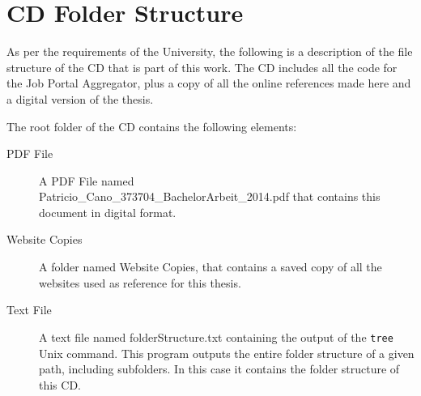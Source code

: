 \section{CD Folder Structure}
As per the requirements of the University, the following is a description of the file structure of the CD that is part of this work. The CD includes all the code for the Job Portal Aggregator, plus a copy of all the online references made here and a digital version of the thesis.

The root folder of the CD contains the following elements:
\begin{description}
\item[PDF File] A PDF File named\\ Patricio\_Cano\_373704\_BachelorArbeit\_2014.pdf that contains this document in digital format.
\item[Website Copies] A folder named Website Copies, that contains a saved copy of all the websites used as reference for this thesis.
\item[Text File] A text file named folderStructure.txt containing the output of the \texttt{tree} Unix command. This program outputs the entire folder structure of a given path, including subfolders. In this case it contains the folder structure of this CD.
\end{description}
